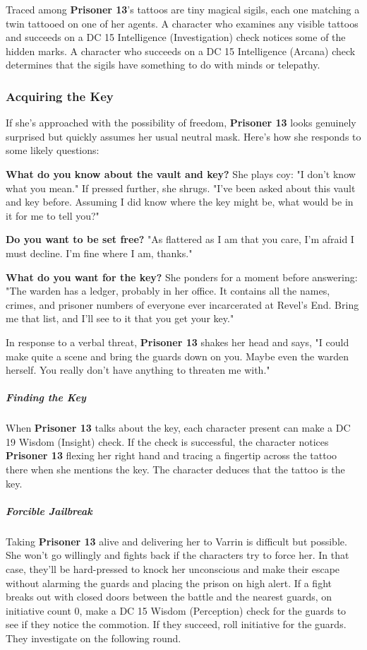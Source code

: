 \documentclass[10pt,a4paper,twoside,bg=print,twocolumn,openany,nodeprecatedcode]{dndbook}
\begin{document}
Traced among \textbf{Prisoner 13}'s tattoos are tiny magical sigils, each one matching a twin tattooed on one of her agents. A character who examines any visible tattoos and succeeds on a DC 15 Intelligence (Investigation) check notices some of the hidden marks. A character who succeeds on a DC 15 Intelligence (Arcana) check determines that the sigils have something to do with minds or telepathy.

\subsubsection{Acquiring the Key}
If she's approached with the possibility of freedom, \textbf{Prisoner 13} looks genuinely surprised but quickly assumes her usual neutral mask. Here's how she responds to some likely questions:

\textbf{What do you know about the vault and key?} She plays coy: "I don't know what you mean." If pressed further, she shrugs. "I've been asked about this vault and key before. Assuming I did know where the key might be, what would be in it for me to tell you?"

\textbf{Do you want to be set free?} "As flattered as I am that you care, I'm afraid I must decline. I'm fine where I am, thanks."

\textbf{What do you want for the key?} She ponders for a moment before answering: "The warden has a ledger, probably in her office. It contains all the names, crimes, and prisoner numbers of everyone ever incarcerated at Revel's End. Bring me that list, and I'll see to it that you get your key."

In response to a verbal threat, \textbf{Prisoner 13} shakes her head and says, "I could make quite a scene and bring the guards down on you. Maybe even the warden herself. You really don't have anything to threaten me with."

\subparagraph{Finding the Key}
When \textbf{Prisoner 13} talks about the key, each character present can make a DC 19 Wisdom (Insight) check. If the check is successful, the character notices \textbf{Prisoner 13} flexing her right hand and tracing a fingertip across the tattoo there when she mentions the key. The character deduces that the tattoo is the key.

\subparagraph{Forcible Jailbreak}
Taking \textbf{Prisoner 13} alive and delivering her to Varrin is difficult but possible. She won't go willingly and fights back if the characters try to force her. In that case, they'll be hard-pressed to knock her unconscious and make their escape without alarming the guards and placing the prison on high alert. If a fight breaks out with closed doors between the battle and the nearest guards, on initiative count 0, make a DC 15 Wisdom (Perception) check for the guards to see if they notice the commotion. If they succeed, roll initiative for the guards. They investigate on the following round.
\end{document}
